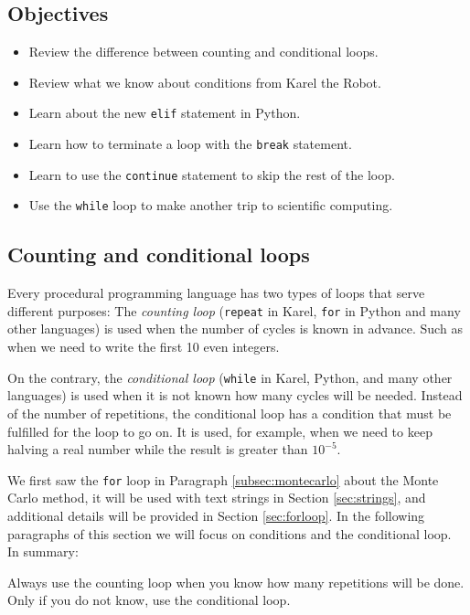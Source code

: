 \documentclass[article,A4,12pt]{llncs}
\begin{document}
\subsection{Objectives}

\begin{itemize}
\item Review the difference between counting and conditional loops.
\item Review what we know about conditions from Karel the Robot.
\item Learn about the new {\tt elif} statement in Python.
\item Learn how to terminate a loop with the {\tt break} statement.
\item Learn to use the {\tt continue} statement to skip the rest of the loop.
\item Use the {\tt while} loop to make another trip to scientific computing.
\end{itemize}

\subsection{Counting and conditional loops}

Every procedural programming language has two types of loops 
that serve different purposes: The {\em counting loop} ({\tt repeat} in Karel, 
{\tt for} in Python and many other languages) is used when the number of cycles 
is known in advance. Such as when we need to write the first 10 even integers. 

On the contrary, the {\em conditional loop} ({\tt while} in Karel, Python,
and many other languages) is used when it is not known how many cycles will be 
needed. Instead of the number of repetitions, the conditional loop has a condition 
that must be fulfilled for the loop to go on. It is used, for example, when we 
need to keep halving a real number while the result is greater than $10^{-5}$. 

We first saw the {\tt for} loop in Paragraph \ref{subsec:montecarlo} about the Monte Carlo method,
it will be used with text strings in Section \ref{sec:strings}, and additional details 
will be provided in Section \ref{sec:forloop}. In the following paragraphs of this section 
we will focus on conditions and the conditional loop.\\

\noindent
In summary:\\

\begin{gbox}
Always use the counting loop when you know how many repetitions will be done. Only if you do not know, use 
the conditional loop.
\end{gbox}
\end{document}
